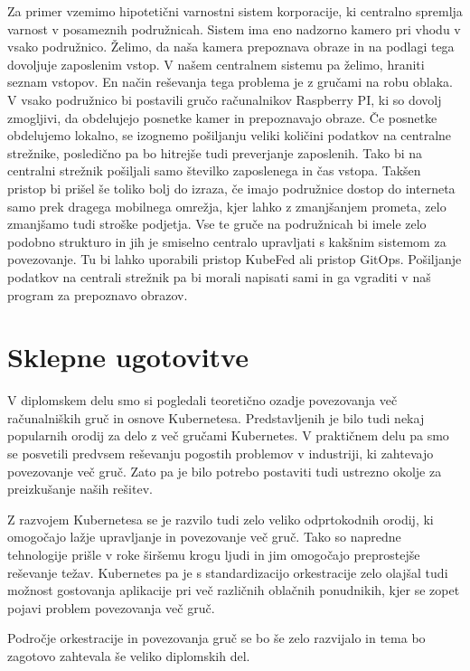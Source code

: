 \documentclass[a4paper, 12pt]{book}
\begin{document}
Za primer vzemimo hipotetični varnostni sistem korporacije, ki centralno spremlja varnost v posameznih podružnicah.
Sistem ima eno nadzorno kamero pri vhodu v vsako podružnico.
Želimo, da naša kamera prepoznava obraze in na podlagi tega dovoljuje zaposlenim vstop.
V našem centralnem sistemu pa želimo, hraniti seznam vstopov.
En način reševanja tega problema je z gručami na robu oblaka.
V vsako podružnico bi postavili gručo rač\-un\-al\-ni\-kov Raspberry PI, ki so dovolj zmogljivi, da obdelujejo posnetke kamer in prepoznavajo obraze.
Če posnetke obdelujemo lokalno, se izognemo pošiljanju veliki količini podatkov na centralne strežnike, posledično pa bo hitrejše tudi preverjanje zaposlenih.
Tako bi na centralni strežnik pošiljali samo številko zaposlenega in čas vstopa.
Takšen pristop bi prišel še toliko bolj do izraza, če imajo podružnice dostop do interneta samo prek dragega mobilnega omrežja, kjer lahko z zmanjšanjem prometa, zelo zmanjšamo tudi stroške podjetja.
Vse te gruče na podružnicah bi imele zelo podobno strukturo in jih je smiselno centralo upravljati s kakšnim sistemom za povezovanje. 
Tu bi lahko uporabili pristop KubeFed ali pristop GitOps.
Pošiljanje podatkov na centrali strežnik pa bi morali napisati sami in ga vgraditi v naš program za prepoznavo obrazov.
\chapter{Sklepne ugotovitve}
V diplomskem delu smo si pogledali teoretično ozadje povezovanja več rač\-un\-al\-ni\-ških gruč in osnove Kubernetesa.
Predstavljenih je bilo tudi nekaj popularnih orodij za delo z več gručami Kubernetes.
V praktičnem delu pa smo se posvetili predvsem reševanju pogostih problemov v industriji, ki zahtevajo povezovanje več gruč.
Zato pa je bilo potrebo postaviti tudi ustrezno okolje za preizkušanje naših rešitev.

Z razvojem Kubernetesa se je razvilo tudi zelo veliko odprtokodnih orodij, ki omogočajo lažje upravljanje in povezovanje več gruč.
Tako so napredne tehnologije prišle v roke širšemu krogu ljudi in jim omogočajo preprostejše reševanje težav.
Kubernetes pa je s standardizacijo orkestracije zelo olajšal tudi možnost gostovanja aplikacije pri več različnih oblačnih ponudnikih, kjer se zopet pojavi problem povezovanja več gruč.

Področje orkestracije in povezovanja gruč se bo še zelo razvijalo in tema bo zagotovo zahtevala še veliko diplomskih del.

\newpage %
\newpage %
\newpage %
\newpage %
\ \\
\clearpage
{}


\end{document}
